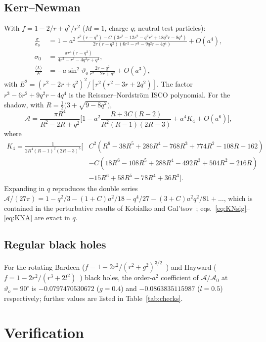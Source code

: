 \documentclass[11pt,a4paper]{article}
\theoremstyle{remark}
\numberwithin{equation}{section}
\begin{document}
\subsection{Kerr--Newman}
With $f=1-2/r+q^2/r^2$ ($M=1$, charge $q$; neutral test particles):
\begin{align}
\frac{\sigma}{\sigma_0}&=1-a^2\,\frac{r^2(r-q^2)-C\,(3r^3-12r^2-q^2r^2+18q^2r-8q^4)}
{2r(r-q^2)(6r^2-r^3-9q^2r+4q^4)}+O(a^4),\label{eq:KNsig}\\
\sigma_0&=\frac{\pi r^4(r-q^2)}{4r^2-r^3-4q^2r+q^4},\nonumber\\
\frac{\langle L\rangle}{E}&=-a\sin^2\vartheta_o\,\frac{2r-q^2}{r^2-2r+q^2}+O(a^3),
\end{align}
with $E^2=(r^2-2r+q^2)^2/[r^2(r^2-3r+2q^2)]$. The factor $r^3-6r^2+9q^2r-4q^4$ is the
Reissner--Nordstr\"om ISCO polynomial. For the shadow, with $R=\tfrac12\big(3+\sqrt{9-8q^2}\big)$,
\begin{equation}
\mathcal A=\frac{\pi R^4}{R^2-2R+q^2}\Big[1-a^2\frac{R+3C(R-2)}{R^2(R-1)(2R-3)}+a^4K_4+O(a^6)\Big],
\label{eq:KNA}
\end{equation}
where
\begin{align*}
K_4=\frac{1}{2R^4(R-1)^2(2R-3)^5}\Big[&C^2(R^6-38R^5+286R^4-768R^3+774R^2-108R-162)\\
&-C(18R^6-108R^5+288R^4-492R^3+504R^2-216R)\\
&-15R^6+58R^5-78R^4+36R^3\Big].
\end{align*}
Expanding in $q$ reproduces the double series
$\mathcal A/(27\pi)=1-q^2/3-(1+C)a^2/18-q^4/27-(3+C)a^2q^2/81+\dots$, which is contained in the perturbative
results of Kobialko and Gal'tsov~\cite{KobialkoGaltsov2026}; eqs.~\eqref{eq:KNsig}--\eqref{eq:KNA} are exact in $q$.

\subsection{Regular black holes}
For the rotating Bardeen ($f=1-2r^2/(r^2+g^2)^{3/2}$~\cite{AyonBeatoGarcia2000}) and Hayward ($f=1-2r^2/(r^3+2l^2)$~\cite{Hayward2006}) black holes,
the order-$a^2$ coefficient of $\mathcal A/\mathcal A_0$ at $\vartheta_o=90^\circ$ is $-0.0797470530672$
($g=0.4$) and $-0.0863835115987$ ($l=0.5$) respectively; further values are listed in
Table~\ref{tab:checks}.

\section{Verification}\label{sec:checks}
\end{document}
